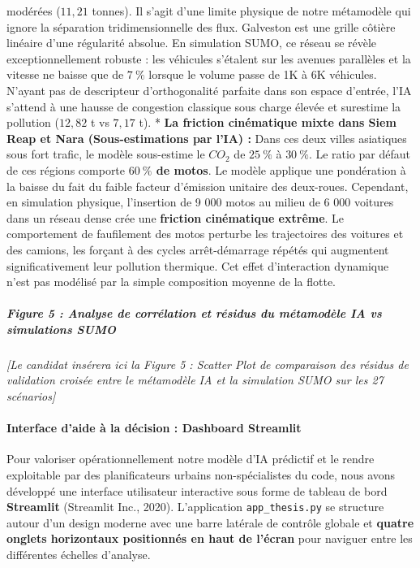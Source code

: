 \documentclass[10pt, a4paper]{article}
\begin{document}
modérées (\(11,21\) tonnes). Il s'agit d'une limite physique de notre
métamodèle qui ignore la séparation tridimensionnelle des flux.
Galveston est une grille côtière linéaire d'une régularité absolue. En
simulation SUMO, ce réseau se révèle exceptionnellement robuste : les
véhicules s'étalent sur les avenues parallèles et la vitesse ne baisse
que de \(7\ \%\) lorsque le volume passe de 1K à 6K véhicules. N'ayant
pas de descripteur d'orthogonalité parfaite dans son espace d'entrée,
l'IA s'attend à une hausse de congestion classique sous charge élevée et
surestime la pollution (\(12,82\) t vs \(7,17\) t). * \textbf{La
friction cinématique mixte dans Siem Reap et Nara (Sous-estimations par
l'IA) :} Dans ces deux villes asiatiques sous fort trafic, le modèle
sous-estime le \(CO_2\) de \(25\ \%\) à \(30\ \%\). Le ratio par défaut
de ces régions comporte \textbf{\(60\ \%\) de motos}. Le modèle applique
une pondération à la baisse du fait du faible facteur d'émission
unitaire des deux-roues. Cependant, en simulation physique, l'insertion
de 9 000 motos au milieu de 6 000 voitures dans un réseau dense crée une
\textbf{friction cinématique extrême}. Le comportement de faufilement
des motos perturbe les trajectoires des voitures et des camions, les
forçant à des cycles arrêt-démarrage répétés qui augmentent
significativement leur pollution thermique. Cet effet d'interaction
dynamique n'est pas modélisé par la simple composition moyenne de la
flotte.

\subparagraph{Figure 5 : Analyse de corrélation et résidus du métamodèle
IA vs simulations
SUMO}\label{figure-5-analyse-de-corruxe9lation-et-ruxe9sidus-du-muxe9tamoduxe8le-ia-vs-simulations-sumo}

\emph{{[}Le candidat insérera ici la Figure 5 : Scatter Plot de
comparaison des résidus de validation croisée entre le métamodèle IA et
la simulation SUMO sur les 27 scénarios{]}}

\paragraph{Interface d'aide à la décision : Dashboard
Streamlit}\label{interface-daide-uxe0-la-duxe9cision-dashboard-streamlit}

Pour valoriser opérationnellement notre modèle d'IA prédictif et le
rendre exploitable par des planificateurs urbains non-spécialistes du
code, nous avons développé une interface utilisateur interactive sous
forme de tableau de bord \textbf{Streamlit} (Streamlit Inc., 2020).
L'application \texttt{app\_thesis.py} se structure autour d'un design
moderne avec une barre latérale de contrôle globale et \textbf{quatre
onglets horizontaux positionnés en haut de l'écran} pour naviguer entre
les différentes échelles d'analyse.
\end{document}
